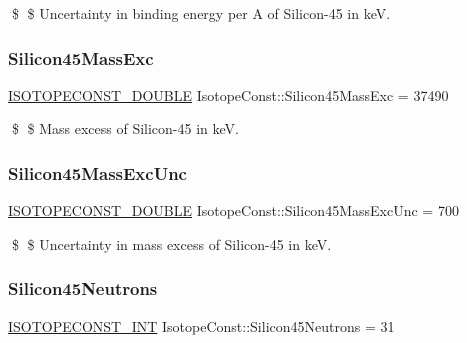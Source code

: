 \$ \$ Uncertainty in binding energy per A of Silicon-\/45 in keV. \mbox{\label{group___isotope_const-_silicon-_si45_ga076196da8f92fe9ac70b03695a4b3050}} 
\subsubsection{\texorpdfstring{Silicon45\+Mass\+Exc}{Silicon45MassExc}}
{\footnotesize\ttfamily \mbox{\hyperlink{group___isotope_const-_macros_ga8f45a7272ce02c0b4c65c44636ed719a}{I\+S\+O\+T\+O\+P\+E\+C\+O\+N\+S\+T\+\_\+\+D\+O\+U\+B\+LE}} Isotope\+Const\+::\+Silicon45\+Mass\+Exc = 37490}

\$ \$ Mass excess of Silicon-\/45 in keV. \mbox{\label{group___isotope_const-_silicon-_si45_ga02162cac4878e16854b55bd5cd07f437}} 
\subsubsection{\texorpdfstring{Silicon45\+Mass\+Exc\+Unc}{Silicon45MassExcUnc}}
{\footnotesize\ttfamily \mbox{\hyperlink{group___isotope_const-_macros_ga8f45a7272ce02c0b4c65c44636ed719a}{I\+S\+O\+T\+O\+P\+E\+C\+O\+N\+S\+T\+\_\+\+D\+O\+U\+B\+LE}} Isotope\+Const\+::\+Silicon45\+Mass\+Exc\+Unc = 700}

\$ \$ Uncertainty in mass excess of Silicon-\/45 in keV. \mbox{\label{group___isotope_const-_silicon-_si45_gad164a042c0c3a7ef30e4495cd7315756}} 
\subsubsection{\texorpdfstring{Silicon45\+Neutrons}{Silicon45Neutrons}}
{\footnotesize\ttfamily \mbox{\hyperlink{group___isotope_const-_macros_ga5f18360b3e99483a35c32d789e62621c}{I\+S\+O\+T\+O\+P\+E\+C\+O\+N\+S\+T\+\_\+\+I\+NT}} Isotope\+Const\+::\+Silicon45\+Neutrons = 31}

